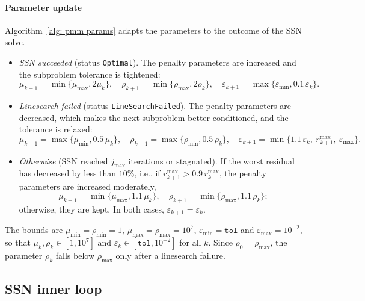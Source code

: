 \paragraph{Parameter update} Algorithm~\ref{alg: pmm params} adapts the parameters to the outcome of the SSN solve.
\begin{itemize}
    \item \emph{SSN succeeded} (status \texttt{Optimal}). The penalty parameters are increased and the subproblem tolerance is tightened:
    \[
        \mu_{k+1} = \min\{\mu_{\max}, 2\mu_k\}, \quad \rho_{k+1} = \min\{\rho_{\max}, 2\rho_k\}, \quad \varepsilon_{k+1} = \max\{\varepsilon_{\min}, 0.1\,\varepsilon_k\}.
    \]
    \item \emph{Linesearch failed} (status \texttt{LineSearchFailed}). The penalty parameters are decreased, which makes the next subproblem better conditioned, and the tolerance is relaxed:
    \[
        \mu_{k+1} = \max\{\mu_{\min}, 0.5\,\mu_k\}, \quad \rho_{k+1} = \max\{\rho_{\min}, 0.5\,\rho_k\}, \quad \varepsilon_{k+1} = \min\{1.1\,\varepsilon_k,\ r^{\max}_{k+1},\ \varepsilon_{\max}\}.
    \]
    \item \emph{Otherwise} (SSN reached $j_{\max}$ iterations or stagnated). If the worst residual has decreased by less than $10\%$, i.e., if $r^{\max}_{k+1} > 0.9\, r^{\max}_k$, the penalty parameters are increased moderately,
    \[
        \mu_{k+1} = \min\{\mu_{\max}, 1.1\,\mu_k\}, \quad \rho_{k+1} = \min\{\rho_{\max}, 1.1\,\rho_k\};
    \]
    otherwise, they are kept. In both cases, $\varepsilon_{k+1} = \varepsilon_k$.
\end{itemize}
The bounds are $\mu_{\min} = \rho_{\min} = 1$, $\mu_{\max} = \rho_{\max} = 10^7$, $\varepsilon_{\min} = \texttt{tol}$ and $\varepsilon_{\max} = 10^{-2}$, so that $\mu_k,\rho_k \in [1,10^7]$ and $\varepsilon_k \in [\texttt{tol},10^{-2}]$ for all $k$. Since $\rho_0 = \rho_{\max}$, the parameter $\rho_k$ falls below $\rho_{\max}$ only after a linesearch failure.


\subsection{SSN inner loop} \label{subsec: SSN implementation}

